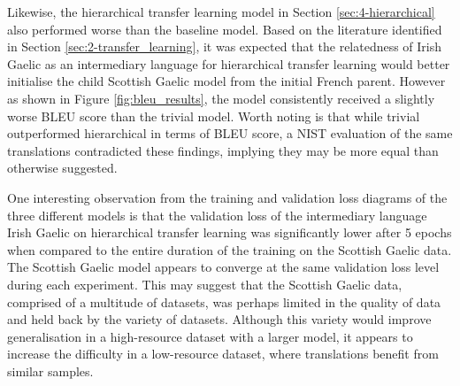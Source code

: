 Likewise, the hierarchical transfer learning model in Section \ref{sec:4-hierarchical} also performed worse than the baseline model. Based on the literature identified in Section \ref{sec:2-transfer_learning}, it was expected that the relatedness of Irish Gaelic as an intermediary language for hierarchical transfer learning would better initialise the child Scottish Gaelic model from the initial French parent. However as shown in Figure \ref{fig:bleu_results}, the model consistently received a slightly worse \acrshort{BLEU} score than the trivial model. Worth noting is that while trivial outperformed hierarchical in terms of \acrshort{BLEU} score, a \acrshort{NIST} evaluation of the same translations contradicted these findings, implying they may be more equal than otherwise suggested.

One interesting observation from the training and validation loss diagrams of the three different models is that the validation loss of the intermediary language Irish Gaelic on hierarchical transfer learning was significantly lower after 5 epochs when compared to the entire duration of the training on the Scottish Gaelic data. The Scottish Gaelic model appears to converge at the same validation loss level during each experiment. This may suggest that the Scottish Gaelic data, comprised of a multitude of datasets, was perhaps limited in the quality of data and held back by the variety of datasets. Although this variety would improve generalisation in a high-resource dataset with a larger model, it appears to increase the difficulty in a low-resource dataset, where translations benefit from similar samples.